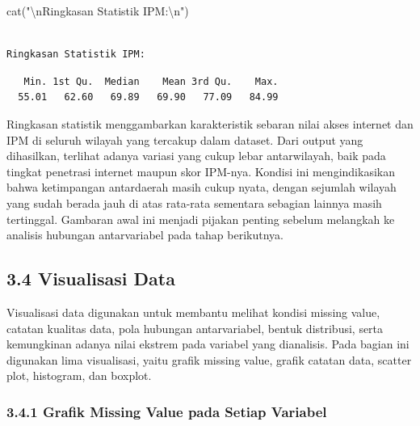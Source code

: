 \documentclass[
  indonesian,
  letterpaper,
  DIV=11,
  numbers=noendperiod]{scrartcl}
\newenvironment{Shaded}{\begin{snugshade}}{\end{snugshade}}
\newcommand{\FunctionTok}[1]{\textcolor[rgb]{0.28,0.35,0.67}{#1}}
\newcommand{\NormalTok}[1]{\textcolor[rgb]{0.00,0.23,0.31}{#1}}
\newcommand{\SpecialCharTok}[1]{\textcolor[rgb]{0.37,0.37,0.37}{#1}}
\newcommand{\StringTok}[1]{\textcolor[rgb]{0.13,0.47,0.30}{#1}}
\begin{document}
\begin{Shaded}
\begin{Highlighting}[]
\FunctionTok{cat}\NormalTok{(}\StringTok{"}\SpecialCharTok{\textbackslash{}n}\StringTok{Ringkasan Statistik IPM:}\SpecialCharTok{\textbackslash{}n}\StringTok{"}\NormalTok{)}
\end{Highlighting}
\end{Shaded}

\begin{verbatim}

Ringkasan Statistik IPM:
\end{verbatim}

\begin{Shaded}
\end{Shaded}

\begin{verbatim}
   Min. 1st Qu.  Median    Mean 3rd Qu.    Max. 
  55.01   62.60   69.89   69.90   77.09   84.99 
\end{verbatim}

Ringkasan statistik menggambarkan karakteristik sebaran nilai akses
internet dan IPM di seluruh wilayah yang tercakup dalam dataset. Dari
output yang dihasilkan, terlihat adanya variasi yang cukup lebar
antarwilayah, baik pada tingkat penetrasi internet maupun skor IPM-nya.
Kondisi ini mengindikasikan bahwa ketimpangan antardaerah masih cukup
nyata, dengan sejumlah wilayah yang sudah berada jauh di atas rata-rata
sementara sebagian lainnya masih tertinggal. Gambaran awal ini menjadi
pijakan penting sebelum melangkah ke analisis hubungan antarvariabel
pada tahap berikutnya.

\subsection{3.4 Visualisasi Data}\label{visualisasi-data}

Visualisasi data digunakan untuk membantu melihat kondisi missing value,
catatan kualitas data, pola hubungan antarvariabel, bentuk distribusi,
serta kemungkinan adanya nilai ekstrem pada variabel yang dianalisis.
Pada bagian ini digunakan lima visualisasi, yaitu grafik missing value,
grafik catatan data, scatter plot, histogram, dan boxplot.

\subsubsection{3.4.1 Grafik Missing Value pada Setiap
Variabel}\label{grafik-missing-value-pada-setiap-variabel}
\end{document}
